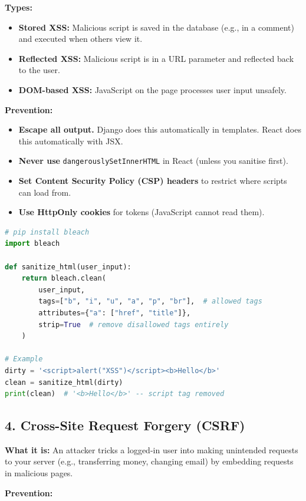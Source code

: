 \documentclass[12pt, a4paper, oneside]{book}
\begin{document}
\textbf{Types:}
\begin{itemize}[leftmargin=2em]
    \item \textbf{Stored XSS:} Malicious script is saved in the database (e.g., in a comment) and executed when others view it.
    \item \textbf{Reflected XSS:} Malicious script is in a URL parameter and reflected back to the user.
    \item \textbf{DOM-based XSS:} JavaScript on the page processes user input unsafely.
\end{itemize}

\textbf{Prevention:}
\begin{itemize}[leftmargin=2em]
    \item \textbf{Escape all output.} Django does this automatically in templates. React does this automatically with JSX.
    \item \textbf{Never use} \texttt{dangerouslySetInnerHTML} in React (unless you sanitise first).
    \item \textbf{Set Content Security Policy (CSP) headers} to restrict where scripts can load from.
    \item \textbf{Use HttpOnly cookies} for tokens (JavaScript cannot read them).
\end{itemize}

\begin{lstlisting}[language=Python, caption={XSS prevention: sanitising user input}]
# pip install bleach
import bleach

def sanitize_html(user_input):
    return bleach.clean(
        user_input,
        tags=["b", "i", "u", "a", "p", "br"],  # allowed tags
        attributes={"a": ["href", "title"]},
        strip=True  # remove disallowed tags entirely
    )

# Example
dirty = '<script>alert("XSS")</script><b>Hello</b>'
clean = sanitize_html(dirty)
print(clean)  # '<b>Hello</b>' -- script tag removed
\end{lstlisting}

\subsection{4. Cross-Site Request Forgery (CSRF)}

\textbf{What it is:} An attacker tricks a logged-in user into making unintended requests to your server (e.g., transferring money, changing email) by embedding requests in malicious pages.

\textbf{Prevention:}
\end{document}

